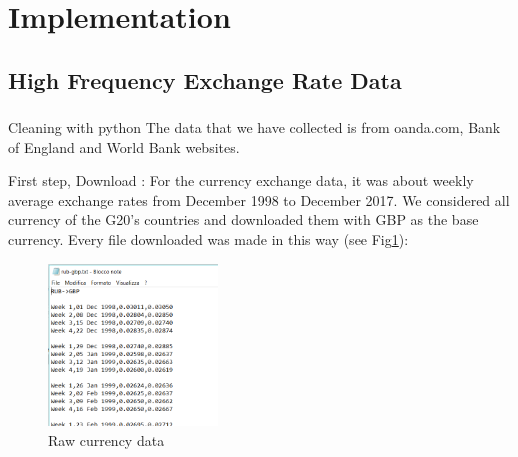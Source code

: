 \section{Implementation}
\subsection{High Frequency Exchange Rate Data}
\subsubsection{}{Cleaning with python}
\newline
The data that we have collected is from oanda.com, Bank of England and World Bank websites. 
\newline

First step, Download : For the currency exchange data, it was about weekly average exchange rates from December 1998 to December 2017. We considered all currency of the G20's countries and downloaded them with GBP as the base currency\cite{abbate2018point}. Every file downloaded was made in this way (see Fig\ref{raw_curr}): 

\begin{figure}[!h]
	\begin{center}
		\includegraphics[width=0.40\textwidth]{aaa2.png}
		\caption{Raw currency data}
		\label{raw_curr}
	\end{center}
\end{figure}


